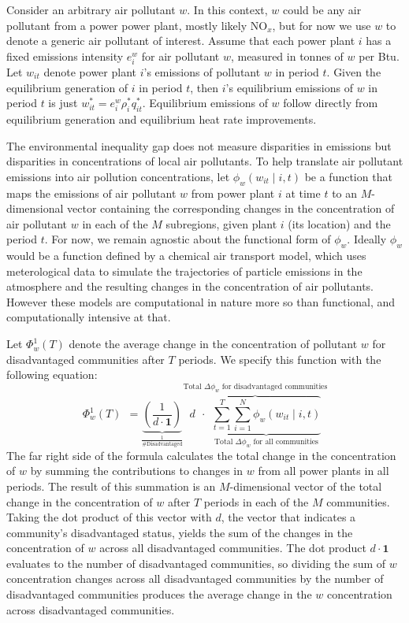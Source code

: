 Consider an arbitrary air pollutant $w$. In this context, $w$ could be any air pollutant from a power power plant, mostly likely NO$_x$, but for now we use $w$ to denote a generic air pollutant of interest. Assume that each power plant $i$ has a fixed emissions intensity $e_i^w$ for air pollutant $w$, measured in tonnes of $w$ per Btu. Let $w_{it}$ denote power plant $i$'s emissions of pollutant $w$ in period $t$. Given the equilibrium generation of $i$ in period $t$, then $i$'s equilibrium emissions of $w$ in period $t$ is just $w_{it}^* = e_i^w \rho_i^* q_{it}^*$. Equilibrium emissions of $w$ follow directly from equilibrium generation and equilibrium heat rate improvements.

The environmental inequality gap does not measure disparities in emissions but disparities in concentrations of local air pollutants. To help translate air pollutant emissions into air pollution concentrations, let $\phi_w (w_{it}\mid i, t)$ be a function that maps the emissions of air pollutant $w$ from power plant $i$ at time $t$ to an $M$-dimensional vector containing the corresponding changes in the concentration of air pollutant $w$ in each of the $M$ subregions, given plant $i$ (its location) and the period $t$. For now, we remain agnostic about the functional form of $\phi_w$. Ideally $\phi_w$ would be a function defined by a chemical air transport model, which uses meterological data to simulate the trajectories of particle emissions in the atmosphere and the resulting changes in the concentration of air pollutants. However these models are computational in nature more so than functional, and computationally intensive at that. 

Let $\Phi_w^1(T)$ denote the average change in the concentration of pollutant $w$ for disadvantaged communities after $T$ periods. We specify this function with the following equation:
    \begin{equation} \label{Phi_w_1}
        \Phi_w^1(T) ~~ = \underbrace{\left(\frac{1}{d \cdot \textbf{1}}\right)}_{\frac{1}{\text{\# Disadvantaged}}} \overbrace{d ~~ \cdot ~~\underbrace{\sum_{t = 1}^T \sum_{i=1}^N \phi_w(w_{it}\mid i, t)}_{\text{Total $\Delta \phi_w$ for all communities}}}^\text{Total $\Delta \phi_w$ for disadvantaged communities}
    \end{equation} 
The far right side of the formula calculates the total change in the concentration of $w$ by summing the contributions to changes in $w$ from all power plants in all periods. The result of this summation is an $M$-dimensional vector of the total change in the concentration of $w$ after $T$ periods in each of the $M$ communities. Taking the dot product of this vector with $d$, the vector that indicates a community's disadvantaged status, yields the sum of the changes in the concentration of $w$ across all disadvantaged communities. The dot product $d \cdot \textbf{1}$ evaluates to the number of disadvantaged communities, so dividing the sum of $w$ concentration changes across all disadvantaged communities by the number of disadvantaged communities produces the average change in the $w$ concentration across disadvantaged communities. 

